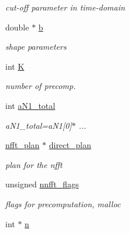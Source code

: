 \begin{DoxyCompactItemize}
\begin{DoxyCompactList}\small\item\em cut-\/off parameter in time-\/domain \end{DoxyCompactList}\item 
\hypertarget{structnnfft__plan_aa91e909254c1beb83e2e971df50b96ca}{double $\ast$ \hyperlink{structnnfft__plan_aa91e909254c1beb83e2e971df50b96ca}{b}}\label{structnnfft__plan_aa91e909254c1beb83e2e971df50b96ca}

\begin{DoxyCompactList}\small\item\em shape parameters \end{DoxyCompactList}\item 
int \hyperlink{structnnfft__plan_a4ee39bebbff40746c2701ade2e13f1f8}{K}
\begin{DoxyCompactList}\small\item\em number of precomp. \end{DoxyCompactList}\item 
int \hyperlink{structnnfft__plan_acb1a1fa5fdb73d2187e9e9d8e4415921}{a\-N1\-\_\-total}
\begin{DoxyCompactList}\small\item\em a\-N1\-\_\-total=a\-N1\mbox{[}0\mbox{]}$\ast$ ... \end{DoxyCompactList}\item 
\hypertarget{structnnfft__plan_a4dc1f0a5a0ead52ada3ba3b2d7eae75f}{\hyperlink{structnfft__plan}{nfft\-\_\-plan} $\ast$ \hyperlink{structnnfft__plan_a4dc1f0a5a0ead52ada3ba3b2d7eae75f}{direct\-\_\-plan}}\label{structnnfft__plan_a4dc1f0a5a0ead52ada3ba3b2d7eae75f}

\begin{DoxyCompactList}\small\item\em plan for the nfft \end{DoxyCompactList}\item 
\hypertarget{structnnfft__plan_a5414c3133e2342c971b7f4df711e6e9a}{unsigned \hyperlink{structnnfft__plan_a5414c3133e2342c971b7f4df711e6e9a}{nnfft\-\_\-flags}}\label{structnnfft__plan_a5414c3133e2342c971b7f4df711e6e9a}

\begin{DoxyCompactList}\small\item\em flags for precomputation, malloc \end{DoxyCompactList}\item 
\hypertarget{structnnfft__plan_a6b2de2633dd4347692e96887f98c1020}{int $\ast$ \hyperlink{structnnfft__plan_a6b2de2633dd4347692e96887f98c1020}{n}}\label{structnnfft__plan_a6b2de2633dd4347692e96887f98c1020}


\end{DoxyCompactItemize}
